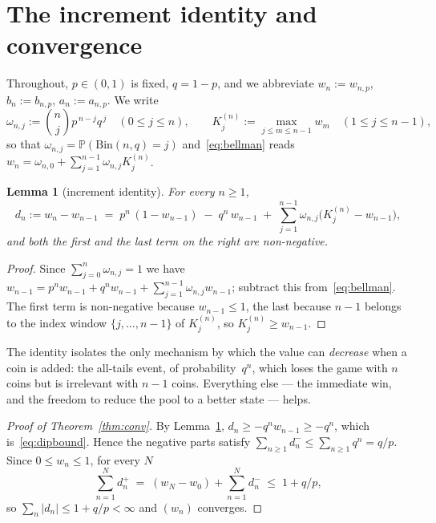 \documentclass[11pt]{article}
\newtheorem{lemma}[theorem]{Lemma}
\theoremstyle{definition}
\newcommand{\Bin}{\mathrm{Bin}}
\newcommand{\Prob}{\mathbb{P}}
\begin{document}
\section{The increment identity and convergence}\label{sec:conv}

Throughout, $p\in(0,1)$ is fixed, $q=1-p$, and we abbreviate
$w_n:=w_{n,p}$, $b_n:=b_{n,p}$, $a_n:=a_{n,p}$.  We write
\[
  \omega_{n,j}:=\binom nj p^{\,n-j}q^{\,j}
  \quad(0\le j\le n),\qquad
  K^{(n)}_j:=\max_{j\le m\le n-1}w_m\quad(1\le j\le n-1),
\]
so that $\omega_{n,j}=\Prob(\Bin(n,q)=j)$ and~\eqref{eq:bellman} reads
$w_n=\omega_{n,0}+\sum_{j=1}^{n-1}\omega_{n,j}K^{(n)}_j$.

\begin{lemma}[increment identity]\label{lem:increment}
  For every $n\ge1$,
  \begin{equation}\label{eq:E}
    d_n:=w_n-w_{n-1}
    \;=\;p^{n}\,(1-w_{n-1})\;-\;q^{n}\,w_{n-1}
    \;+\;\sum_{j=1}^{n-1}\omega_{n,j}\bigl(K^{(n)}_j-w_{n-1}\bigr),
  \end{equation}
  and both the first and the last term on the right are non-negative.
\end{lemma}

\begin{proof}
  Since $\sum_{j=0}^{n}\omega_{n,j}=1$ we have
  $w_{n-1}=p^{n}w_{n-1}+q^{n}w_{n-1}+\sum_{j=1}^{n-1}\omega_{n,j}w_{n-1}$;
  subtract this from~\eqref{eq:bellman}.  The first term is
  non-negative because $w_{n-1}\le1$, the last because $n-1$ belongs to
  the index window $\{j,\dots,n-1\}$ of $K^{(n)}_j$, so
  $K^{(n)}_j\ge w_{n-1}$.
\end{proof}

The identity isolates the only mechanism by which the value can
\emph{decrease} when a coin is added: the all-tails event, of
probability~$q^{n}$, which loses the game with $n$ coins but is
irrelevant with $n-1$ coins.  Everything else --- the immediate win,
and the freedom to reduce the pool to a better state --- helps.

\begin{proof}[Proof of Theorem~\ref{thm:conv}]
  By Lemma~\ref{lem:increment}, $d_n\ge-q^{n}w_{n-1}\ge-q^{n}$, which
  is~\eqref{eq:dipbound}.  Hence the negative parts satisfy
  $\sum_{n\ge1}d_n^{-}\le\sum_{n\ge1}q^{n}=q/p$.  Since
  $0\le w_n\le1$, for every $N$
  \[
    \sum_{n=1}^{N}d_n^{+}
    \;=\;(w_N-w_0)+\sum_{n=1}^{N}d_n^{-}\;\le\;1+q/p ,
  \]
  so $\sum_n|d_n|\le1+q/p<\infty$ and $(w_n)$ converges.
\end{proof}
\end{document}
